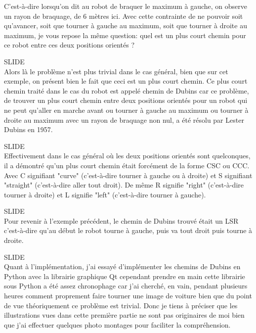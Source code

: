 \documentclass[12pt,a4paper]{article}
\newcommand{\slide}{\vspace{0.6cm}SLIDE\\}
\begin{document}
	C'est-à-dire lorsqu'on dit au robot de braquer le maximum à gauche, on observe un rayon de braquage, de 6 mètres ici. Avec cette contrainte de ne pouvoir soit qu'avancer, soit que tourner à gauche au maximum, soit que tourner à droite au maximum, je vous repose la même question: quel est un plus court chemin pour ce robot entre ces deux positions orientés ?
	
	\slide
	
	Alors là le problème n'est plus trivial dans le cas général, bien que sur cet exemple, on présent bien le fait que ceci est un plus court chemin. Ce plus court chemin traité dans le cas du robot est appelé chemin de Dubins car ce problème, de trouver un plus court chemin entre deux positions orientés pour un robot qui ne peut qu'aller en marche avant ou tourner à gauche au maximum ou tourner à droite au maximum avec un rayon de braquage non nul, a été résolu par Lester Dubins en 1957.
	
	\slide
	
	Effectivement dans le cas général où les deux positions orientés sont quelconques, il a démontré qu'un plus court chemin était forcément de la forme CSC ou CCC. Avec C signifiant "curve" (c'est-à-dire tourner à gauche ou à droite) et S signifiant "straight" (c'est-à-dire aller tout droit). De même R signifie "right" (c'est-à-dire tourner à droite) et L signifie "left" (c'est-à-dire tourner à gauche).
	
	\slide
	
	Pour revenir à l'exemple précédent, le chemin de Dubins trouvé était un LSR c'est-à-dire qu'au début le robot tourne à gauche, puis va tout droit puis tourne à droite. %
	
	\slide
	
	Quant à l'implémentation, j'ai essayé d'implémenter les chemins de Dubins en Python avec la librairie graphique Qt cependant prendre en main cette librairie sous Python a été assez chronophage car j'ai cherché, en vain, pendant plusieurs heures comment proprement faire tourner une image de voiture bien que du point de vue théoriquement ce problème est trivial. Donc je tiens à préciser que les illustrations vues dans cette première partie ne sont pas originaires de moi bien que j'ai effectuer quelques photo montages pour faciliter la compréhension.%
	
\end{document}
